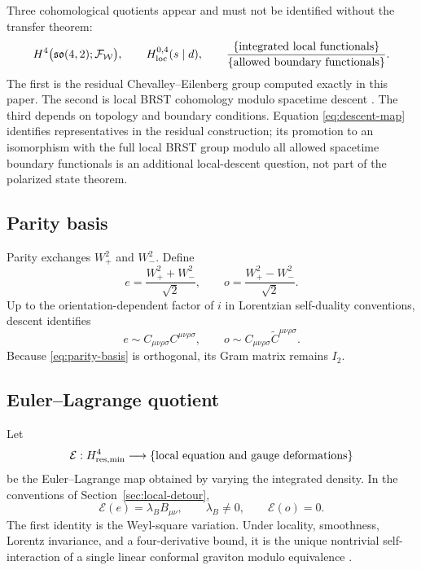 \documentclass[11pt]{article}
\theoremstyle{definition}
\theoremstyle{remark}
\newcommand{\W}{\mathcal W}
\newcommand{\F}{\mathcal F}
\newcommand{\cE}{\mathcal E}
\begin{document}
Three cohomological quotients appear and must not be identified without the
transfer theorem:
\begin{equation}\label{eq:three-cohomologies}
 H^4\bigl(\mathfrak{so}(4,2);\F_{\W}\bigr),
 \qquad
 H^{0,4}_{\rm loc}(s\mid d),
 \qquad
 \frac{\{\text{integrated local functionals}\}}
 {\{\text{allowed boundary functionals}\}}.
\end{equation}
The first is the residual Chevalley--Eilenberg group computed exactly in
this paper.  The second is local BRST cohomology modulo spacetime descent
\cite{BarnichBrandtHenneaux}.  The third depends on topology and boundary
conditions.  Equation \eqref{eq:descent-map} identifies representatives in
the residual construction; its promotion to an isomorphism with the full
local BRST group modulo all allowed spacetime boundary functionals is an
additional local-descent question, not part of the polarized state theorem.

\subsection{Parity basis}

Parity exchanges $W_+^2$ and $W_-^2$.  Define
\begin{equation}\label{eq:parity-basis}
 e=\frac{W_+^2+W_-^2}{\sqrt2},
 \qquad
 o=\frac{W_+^2-W_-^2}{\sqrt2}.
\end{equation}
Up to the orientation-dependent factor of $i$ in Lorentzian self-duality
conventions, descent identifies
\begin{equation}
 e\sim C_{\mu\nu\rho\sigma}C^{\mu\nu\rho\sigma},
 \qquad
 o\sim C_{\mu\nu\rho\sigma}\widetilde
 C^{\mu\nu\rho\sigma}.
\end{equation}
Because \eqref{eq:parity-basis} is orthogonal, its Gram matrix remains
$I_2$.

\subsection{Euler--Lagrange quotient}

Let
\begin{equation}
 \cE:H^4_{\rm res,min}
 \longrightarrow
 \{\text{local equation and gauge deformations}\}
\end{equation}
be the Euler--Lagrange map obtained by varying the integrated density.  In
the conventions of Section~\ref{sec:local-detour},
\begin{equation}\label{eq:EL-map}
 \cE(e)=\lambda_B B_{\mu\nu},
 \qquad \lambda_B\ne0,
 \qquad
 \cE(o)=0.
\end{equation}
The first identity is the Weyl-square variation.  Under locality,
smoothness, Lorentz invariance, and a four-derivative bound, it is the unique
nontrivial self-interaction of a single linear conformal graviton modulo
equivalence \cite{BoulangerHenneaux}.
\end{document}
